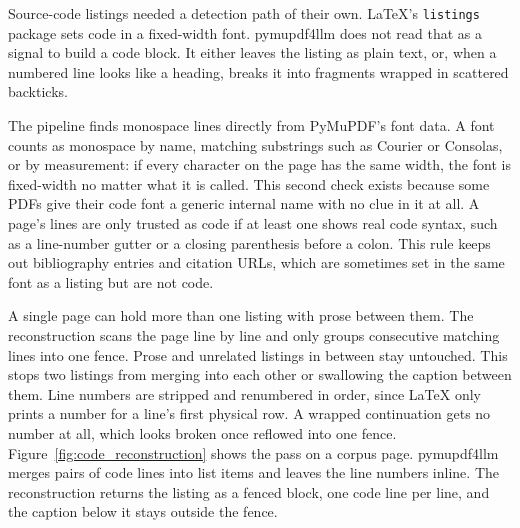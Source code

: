 Source-code listings needed a detection path of their own.
\LaTeX's \texttt{listings} package sets code in a fixed-width font.
pymupdf4llm does not read that as a signal to build a code block.
It either leaves the listing as plain text, or, when a numbered line looks like a heading, breaks it into fragments wrapped in scattered backticks.

The pipeline finds monospace lines directly from PyMuPDF's font data.
A font counts as monospace by name, matching substrings such as Courier or Consolas, or by measurement: if every character on the page has the same width, the font is fixed-width no matter what it is called.
This second check exists because some PDFs give their code font a generic internal name with no clue in it at all.
A page's lines are only trusted as code if at least one shows real code syntax, such as a line-number gutter or a closing parenthesis before a colon.
This rule keeps out bibliography entries and citation URLs, which are sometimes set in the same font as a listing but are not code.

A single page can hold more than one listing with prose between them.
The reconstruction scans the page line by line and only groups consecutive matching lines into one fence.
Prose and unrelated listings in between stay untouched.
This stops two listings from merging into each other or swallowing the caption between them.
Line numbers are stripped and renumbered in order, since \LaTeX{} only prints a number for a line's first physical row.
A wrapped continuation gets no number at all, which looks broken once reflowed into one fence.
Figure~\ref{fig:code_reconstruction} shows the pass on a corpus page.
pymupdf4llm merges pairs of code lines into list items and leaves the line numbers inline.
The reconstruction returns the listing as a fenced block, one code line per line, and the caption below it stays outside the fence.


